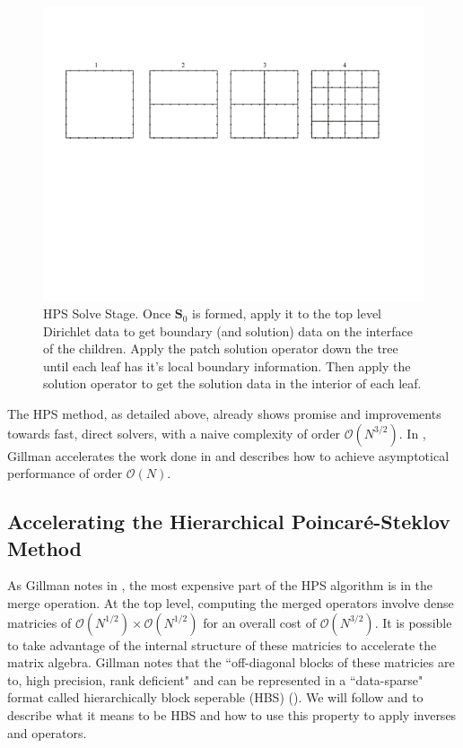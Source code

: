\begin{figure}
    \centering
    \includegraphics[width=\columnwidth]{figures/solve_figure.pdf}
    \caption{HPS Solve Stage. Once $\textbf{S}_0$ is formed, apply it to the top level Dirichlet data to get boundary (and solution) data on the interface of the children. Apply the patch solution operator down the tree until each leaf has it's local boundary information. Then apply the solution operator to get the solution data in the interior of each leaf.}
    \label{fig:solve}
\end{figure}

The HPS method, as detailed above, already shows promise and improvements towards fast, direct solvers, with a naive complexity of order $\mathcal{O}(N^{3/2})$. In \cite{gillman2014direct}, Gillman accelerates the work done in \cite{martinsson2015hierarchical} and describes how to achieve asymptotical performance of order $\mathcal{O}(N)$.

\subsection{Accelerating the Hierarchical Poincaré-Steklov Method}

As Gillman notes in \cite{gillman2014direct}, the most expensive part of the HPS algorithm is in the merge operation. At the top level, computing the merged operators involve dense matricies of $\mathcal{O}(N^{1/2}) \times \mathcal{O}(N^{1/2})$ for an overall cost of $\mathcal{O}(N^{3/2})$. It is possible to take advantage of the internal structure of these matricies to accelerate the matrix algebra. Gillman notes that the ``off-diagonal blocks of these matricies are to, high precision, rank deficient" and can be represented in a ``data-sparse" format called hierarchically block seperable (HBS) (\cite{gillman2014direct}). We will follow \cite{gillman2014direct} and \cite{gillman2012direct} to describe what it means to be HBS and how to use this property to apply inverses and operators.


